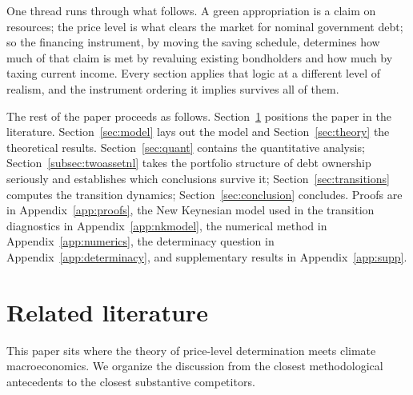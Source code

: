 \documentclass[12pt]{article}
\begin{document}
One thread runs through what follows. A green appropriation is a claim on
resources; the price level is what clears the market for nominal
government debt; so the financing instrument, by moving the saving
schedule, determines how much of that claim is met by revaluing existing
bondholders and how much by taxing current income. Every section applies
that logic at a different level of realism, and the instrument ordering
it implies survives all of them.

The rest of the paper proceeds as follows. Section~\ref{sec:literature}
positions the paper in the literature. Section~\ref{sec:model} lays out the
model and Section~\ref{sec:theory} the theoretical results.
Section~\ref{sec:quant} contains the quantitative analysis;
Section~\ref{subsec:twoassetnl} takes the portfolio structure of debt
ownership seriously and establishes which conclusions survive it;
Section~\ref{sec:transitions} computes the transition dynamics;
Section~\ref{sec:conclusion} concludes. Proofs are in
Appendix~\ref{app:proofs}, the New Keynesian model used in the transition
diagnostics in Appendix~\ref{app:nkmodel}, the numerical method in
Appendix~\ref{app:numerics}, the determinacy question in
Appendix~\ref{app:determinacy}, and supplementary results in
Appendix~\ref{app:supp}.

\section{Related literature}\label{sec:literature}

This paper sits where the theory of price-level determination meets climate
macroeconomics. We organize the discussion from the closest methodological
antecedents to the closest substantive competitors.
\end{document}
